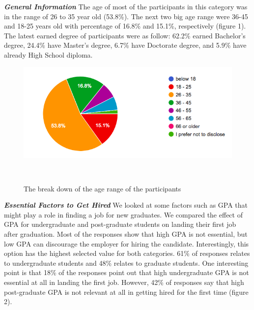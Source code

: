 \documentclass{sigchi}
\begin{document}
\textit{\textbf{General Information}}\newline
The age of most of the participants in this category was in the range of 26 to 35 year old (53.8\%). The next two big age range were 36-45 and 18-25 years old with percentage of 16.8\% and 15.1\%, respectively (figure 1). The latest earned degree of participants were as follow: 62.2\% earned Bachelor's degree, 24.4\% have Master's degree, 6.7\% have Doctorate degree, and 5.9\% have already High School diploma.

\begin{figure}
\centering
  \includegraphics[width=1.05\columnwidth]{figures/age_range}
  \caption{The break down of the age range of the participants}~\label{fig:figure 1}
\end{figure}

\textit{\textbf{Essential Factors to Get Hired}}\newline
We looked at some factors such as GPA that might play a role in finding a job for new graduates. We compared the effect of GPA for undergraduate and post-graduate students on landing their first job after graduation. Most of the responses show that high GPA is not essential, but low GPA can discourage the employer for hiring the candidate. Interestingly, this option has the highest selected value for both categories. 61\% of responses relates to undergraduate students and 48\% relates to graduate students. One interesting point is that 18\% of the responses point out that high undergraduate GPA is not essential at all in landing the first job. However, 42\% of responses say that high post-graduate GPA is not relevant at all in getting hired for the first time (figure 2). 
\end{document}
